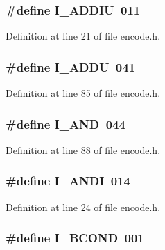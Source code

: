 \subsubsection[{I\+\_\+\+A\+D\+D\+IU}]{\setlength{\rightskip}{0pt plus 5cm}\#define I\+\_\+\+A\+D\+D\+IU~011}\label{encode_8h_a4a89c405a72969ad1e241261621c86d7}


Definition at line 21 of file encode.\+h.

\subsubsection[{I\+\_\+\+A\+D\+DU}]{\setlength{\rightskip}{0pt plus 5cm}\#define I\+\_\+\+A\+D\+DU~041}\label{encode_8h_a199c36ffd5d142d1c816f864bde94530}


Definition at line 85 of file encode.\+h.

\subsubsection[{I\+\_\+\+A\+ND}]{\setlength{\rightskip}{0pt plus 5cm}\#define I\+\_\+\+A\+ND~044}\label{encode_8h_ae99737aebeb535a111509cd9f579a8d1}


Definition at line 88 of file encode.\+h.

\subsubsection[{I\+\_\+\+A\+N\+DI}]{\setlength{\rightskip}{0pt plus 5cm}\#define I\+\_\+\+A\+N\+DI~014}\label{encode_8h_aa450c06459edfb6cc847e23d5efabe9b}


Definition at line 24 of file encode.\+h.

\subsubsection[{I\+\_\+\+B\+C\+O\+ND}]{\setlength{\rightskip}{0pt plus 5cm}\#define I\+\_\+\+B\+C\+O\+ND~001}\label{encode_8h_a45112d693e2a276f7d35a1820dc41ecf}


